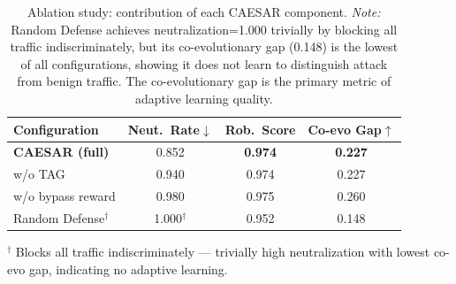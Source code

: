 \begin{table}[htbp]
  \centering
  \caption{Ablation study: contribution of each CAESAR component.
           \emph{Note:} Random Defense achieves neutralization=1.000 trivially by
           blocking all traffic indiscriminately, but its co-evolutionary gap (0.148)
           is the lowest of all configurations, showing it does not learn to
           distinguish attack from benign traffic. The co-evolutionary gap is
           the primary metric of adaptive learning quality.}
  \label{tab:ablation}
  \begin{tabular}{@{} l ccc @{}}
    \toprule
    Configuration & Neut.\ Rate$\downarrow$ & Rob.\ Score & Co-evo Gap$\uparrow$ \\
    \midrule
    \textbf{CAESAR (full)} & 0.852 & \textbf{0.974} & \textbf{0.227} \\
    w/o TAG & 0.940 & 0.974 & 0.227 \\
    w/o bypass reward & 0.980 & 0.975 & 0.260 \\
    Random Defense$^\dagger$ & 1.000$^\dagger$ & 0.952 & 0.148 \\
    \bottomrule
  \end{tabular}
  \smallskip\newline
  \footnotesize{$^\dagger$ Blocks all traffic indiscriminately — trivially high
  neutralization with lowest co-evo gap, indicating no adaptive learning.}
\end{table}